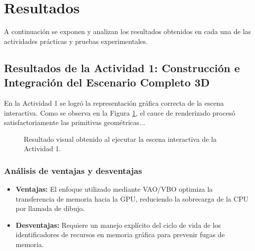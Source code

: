 
\section{Resultados}

A continuación se exponen y analizan los resultados obtenidos en cada una de las actividades prácticas y pruebas experimentales.

\subsection{Resultados de la Actividad 1: Construcción e Integración del Escenario Completo 3D}
En la Actividad 1 se logró la representación gráfica correcta de la escena interactiva. Como se observa en la Figura \ref{fig:resultado_act1}, el cauce de renderizado procesó satisfactoriamente las primitivas geométricas...

\begin{figure}[H]
    \centering
    \setlength{\fboxrule}{1pt}
    \caption{Resultado visual obtenido al ejecutar la escena interactiva de la Actividad 1.}
    \label{fig:resultado_act1}
\end{figure}

\subsubsection{Análisis de ventajas y desventajas}
\begin{itemize}
    \item \textbf{Ventajas:} El enfoque utilizado mediante VAO/VBO optimiza la transferencia de memoria hacia la GPU, reduciendo la sobrecarga de la CPU por llamada de dibujo.
    \item \textbf{Desventajas:} Requiere un manejo explícito del ciclo de vida de los identificadores de recursos en memoria gráfica para prevenir fugas de memoria.
\end{itemize}

